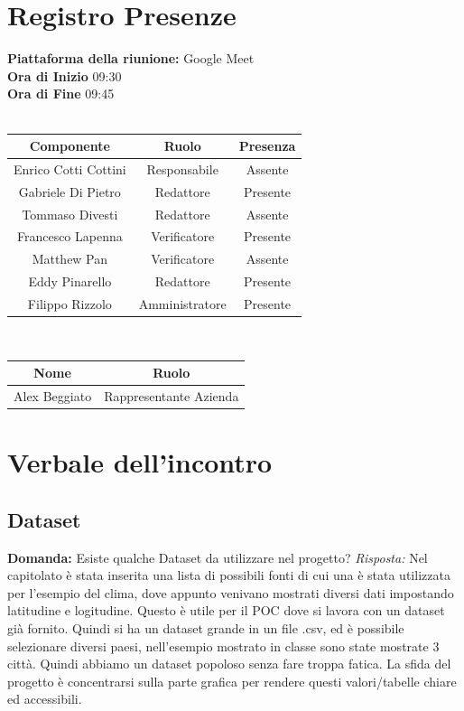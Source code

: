 \documentclass{article}
\begin{document}
\section{Registro Presenze}
\textbf{Piattaforma della riunione:} Google Meet \\
\textbf{Ora di Inizio} 09:30\\
\textbf{Ora di Fine} 09:45\\
\\
\begin{tabular}{|c|c|c|}
    \hline
    \textbf{Componente} & \textbf{Ruolo} & \textbf{Presenza}\\
    \hline
    Enrico Cotti Cottini & Responsabile & Assente \\ 
    \hline
    Gabriele Di Pietro & Redattore & Presente \\ 
    \hline
    Tommaso Divesti & Redattore & Assente \\ 
    \hline %
    Francesco Lapenna & Verificatore & Presente \\ 
    \hline
    Matthew Pan & Verificatore & Assente \\ 
    \hline %
    Eddy Pinarello & Redattore & Presente \\ 
    \hline %
    Filippo Rizzolo & Amministratore & Presente \\ 
    \hline %
\end{tabular}
\\
\newline
\newline
\begin{tabular}{|c|c|}
    \hline
    \textbf{Nome} & \textbf{Ruolo}\\
    \hline
    Alex Beggiato & Rappresentante Azienda \\
    \hline
\end{tabular}
\newpage

\section{Verbale dell'incontro}
\subsection{Dataset}
\textbf{Domanda:} Esiste qualche Dataset da utilizzare nel progetto?
\newline
\textit{Risposta:} Nel capitolato è stata inserita una lista di possibili fonti di cui una è stata utilizzata per l’esempio del clima, dove appunto venivano mostrati diversi dati impostando latitudine e logitudine. Questo è utile per il POC dove si lavora con un dataset già fornito. 
Quindi si ha un dataset grande in un file .csv, ed è possibile selezionare diversi paesi, nell’esempio mostrato in classe sono state mostrate 3 città. Quindi abbiamo un dataset popoloso senza fare troppa fatica.
La sfida del progetto è concentrarsi sulla parte grafica per rendere questi valori/tabelle chiare ed accessibili.
\end{document}
